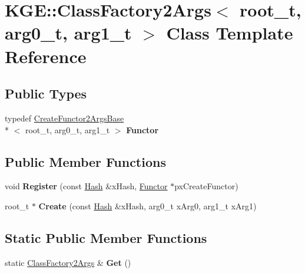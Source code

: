 \hypertarget{class_k_g_e_1_1_class_factory2_args}{\section{K\-G\-E\-:\-:Class\-Factory2\-Args$<$ root\-\_\-t, arg0\-\_\-t, arg1\-\_\-t $>$ Class Template Reference}
\label{class_k_g_e_1_1_class_factory2_args}
}
\subsection*{Public Types}
\begin{DoxyCompactItemize}
\item 
\hypertarget{class_k_g_e_1_1_class_factory2_args_a57e2d8f95d00bac9e0153914ece1a33f}{typedef \hyperlink{class_k_g_e_1_1_create_functor2_args_base}{Create\-Functor2\-Args\-Base}\\*
$<$ root\-\_\-t, arg0\-\_\-t, arg1\-\_\-t $>$ {\bfseries Functor}}\label{class_k_g_e_1_1_class_factory2_args_a57e2d8f95d00bac9e0153914ece1a33f}

\end{DoxyCompactItemize}
\subsection*{Public Member Functions}
\begin{DoxyCompactItemize}
\item 
\hypertarget{class_k_g_e_1_1_class_factory2_args_a9462d75be206de86f848a2ffac32ca9c}{void {\bfseries Register} (const \hyperlink{class_k_g_e_1_1_hash}{Hash} \&x\-Hash, \hyperlink{class_k_g_e_1_1_create_functor2_args_base}{Functor} $\ast$px\-Create\-Functor)}\label{class_k_g_e_1_1_class_factory2_args_a9462d75be206de86f848a2ffac32ca9c}

\item 
\hypertarget{class_k_g_e_1_1_class_factory2_args_a1545f76275ec6b20776c5665f4d86745}{root\-\_\-t $\ast$ {\bfseries Create} (const \hyperlink{class_k_g_e_1_1_hash}{Hash} \&x\-Hash, arg0\-\_\-t x\-Arg0, arg1\-\_\-t x\-Arg1)}\label{class_k_g_e_1_1_class_factory2_args_a1545f76275ec6b20776c5665f4d86745}

\end{DoxyCompactItemize}
\subsection*{Static Public Member Functions}
\begin{DoxyCompactItemize}
\item 
\hypertarget{class_k_g_e_1_1_class_factory2_args_a354edd08806f83cbfe732a5a96dc53bd}{static \hyperlink{class_k_g_e_1_1_class_factory2_args}{Class\-Factory2\-Args} \& {\bfseries Get} ()}\label{class_k_g_e_1_1_class_factory2_args_a354edd08806f83cbfe732a5a96dc53bd}

\end{DoxyCompactItemize}
